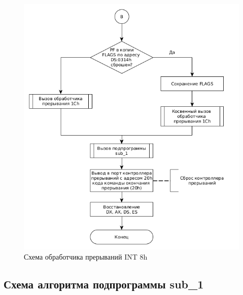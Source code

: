\begin{figure}[ht!]
	\begin{center}
		\includegraphics[scale=0.8]{img/int8h_04}
	\end{center}
	\captionsetup{justification=centering}
	\caption{Схема обработчика прерываний INT 8h}
	\label{img:i4}
\end{figure}
\FloatBarrier

\clearpage

\subsection{Схема алгоритма подпрограммы sub\_1}

